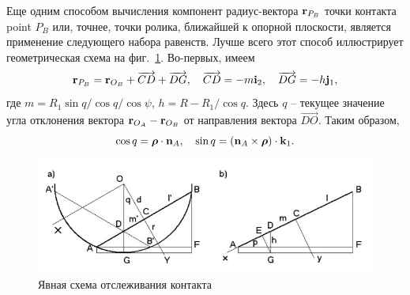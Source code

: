 Еще одним способом вычисления компонент радиус-вектора ${\bf r}_{P_B}$ точки контакта point $P_B$ или, точнее, точки ролика, ближайшей к опорной плоскости, является применение следующего набора равенств.
Лучше всего этот способ иллюстрирует геометрическая схема на фиг.~\ref{fig:figure3}. Во-первых, имеем
$$
{\bf r}_{P_B}={\bf r}_{O_B}+\overrightarrow{CD}+\overrightarrow{DG},\quad
\overrightarrow{CD}=-m{\bf i}_2,\quad\overrightarrow{DG}=-h{\bf j}_1,
$$
где $m=R_1\sin q/\cos q/\cos\psi $, $h=R-R_1/\cos q$. Здесь $q$ -- текущее значение угла отклонения вектора ${\bf r}_{O_A}-{\bf r}_{O_B}$ от 
направления вектора $\overrightarrow{DO}$. Таким образом,
$$
\cos q=\boldsymbol{\mathbf{\rho}}\cdot{\bf n}_A,\quad\sin q=
\left({\bf n}_A\times\boldsymbol{\mathbf{\rho}}\right)\cdot {\bf k}_1.
$$
\begin{figure}[ht]
\centerline{\includegraphics[scale=0.7]{content/parts/3_friction/mo2015/stepanov.png}}
\caption{Явная схема отслеживания контакта}
\label{fig:figure3}
\end{figure}

%

